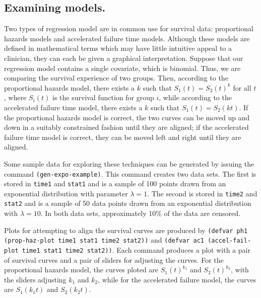 \documentclass[11pt]{article}
\begin{document}
\subsection{Examining models.}
Two types of regression model are in common use for survival data: proportional
hazards models and accelerated failure time models. Although these models are
defined in mathematical terms which may have little intuitive appeal to a
clinician, they can each be given a graphical interpretation. Suppose that our
regression model contains a single covariate, which is binomial. Thus, we are
comparing the survival experience of two groups. Then, according to the
proportional hazards model, there exists a $k$ such that $S_1(t)=S_2(t)^k$ for
all $t$, where $S_i(t)$ is the survival function for group $i$, while according
to the accelerated failure time model, there exists a $k$ such that
$S_1(t)=S_2(kt)$. If the proportional hazards model is correct, the two curves
can be moved up and down in a suitably constrained fashion until they are
aligned; if the accelerated failure time model is correct, they can be moved
left and right until they are aligned.

Some sample data for exploring these techniques can be generated by issuing the
command {\tt (gen-expo-example)}. This command creates two data sets. The first
is stored in {\tt time1} and {\tt stat1} and is a sample of 100 points drawn
from an exponential distribution with parameter $\lambda=1$. The second is
stored in {\tt time2} and {\tt stat2} and is a sample of 50 data points drawn
from an exponential distribution with $\lambda=10$. In both data sets,
approximately 10\% of the data are censored.

Plots for attempting to align the survival curves are produced by {\tt (defvar
ph1 (prop-haz-plot time1 stat1 time2 stat2))} and {\tt (defvar ac1
(accel-fail-plot time1 stat1 time2 stat2))}. Each command produces a plot with
a pair of survival curves and a pair of sliders for adjusting the curves. For
the proportional hazards model, the curves ploted are $S_1(t)^{k_1}$ and
$S_2(t)^{k_2}$, with the sliders adjusting $k_1$ and $k_2$, while for the
accelerated failure model, the curves are $S_1(k_1t)$ and $S_2(k_2t)$.
\end{document}

